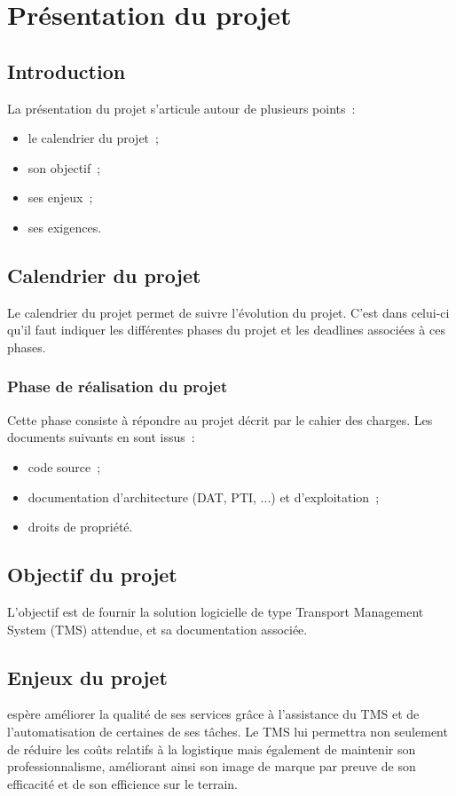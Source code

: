 \chapter{Présentation du projet}\label{Presentation_du_projet}

\section{Introduction}
La présentation du projet s'articule autour de plusieurs points~: 
\begin{itemize}
   \item le calendrier du projet~;
   \item son objectif~;
   \item ses enjeux~;
   \item ses exigences.
\end{itemize}

\section{Calendrier du projet}
Le calendrier du projet permet de suivre l'évolution du projet.
C'est dans celui-ci qu'il faut indiquer les différentes phases du projet et les deadlines associées à ces phases.

\subsection{Phase de réalisation du projet}
Cette phase consiste à répondre au projet décrit par le cahier des charges.
Les documents suivants en sont issus~:
\begin{itemize}
	\item code source~;
	\item documentation d'architecture (DAT, PTI, ...) et d'exploitation~;
	\item droits de propriété.
\end{itemize}

\section{Objectif du projet}
L'objectif est de fournir la solution logicielle de type Transport Management System (TMS) attendue, et sa documentation associée.
 
\section{Enjeux du projet}
\mo espère améliorer la qualité de ses services grâce à l'assistance du TMS et de l'automatisation de certaines de ses tâches.
Le TMS lui permettra non seulement de réduire les coûts relatifs à la logistique mais également de maintenir son professionnalisme, améliorant ainsi son image de marque par preuve de son efficacité et de son efficience sur le terrain.

